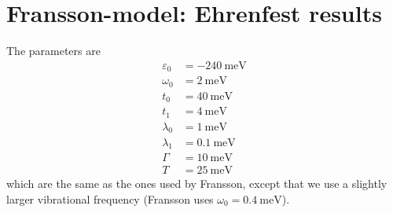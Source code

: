 \documentclass{article}
\begin{document}
\section{Fransson-model: Ehrenfest results}
The parameters are 
\begin{align*}
	\varepsilon_0 &= \SI{-240}{\milli\electronvolt}\\
	\omega_0 &= \SI{2}{\milli\electronvolt}\\
	t_0 &= \SI{40}{\milli\electronvolt}\\
	t_1 &= \SI{4}{\milli\electronvolt}\\
	\lambda_0 &= \SI{1}{\milli\electronvolt}\\
	\lambda_1 &= \SI{0.1}{\milli\electronvolt}\\
	\Gamma &= \SI{10}{\milli\electronvolt}\\
	T &= \SI{25}{\milli\electronvolt}
\end{align*}
which are the same as the ones used by Fransson, except that we use a slightly larger vibrational frequency (Fransson uses $\omega_0 = \SI{0.4}{\milli\electronvolt}$). 
\clearpage
\end{document}
